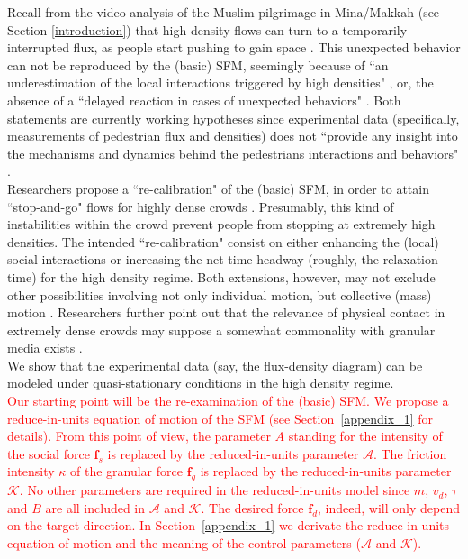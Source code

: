 \documentclass[preprint,12pt]{elsarticle}
\begin{document}
Recall from the video analysis of the Muslim pilgrimage in Mina/Makkah
(see Section \ref{introduction}) that high-density flows can turn to a
temporarily interrupted flux, as people
start pushing to gain space \cite{helbing3}. This unexpected behavior can not be
reproduced by the (basic) SFM, seemingly because of ``an
underestimation of the local interactions triggered by high densities"
\cite{yu1}, or, the absence of a ``delayed reaction in cases of unexpected
behaviors" \cite{johansson}. Both statements are currently working hypotheses since
experimental data (specifically, measurements of pedestrian flux and
densities) does not ``provide any insight into the mechanisms and
dynamics behind the pedestrians interactions and behaviors" \cite{johansson}.\\

Researchers propose a ``re-calibration" of the (basic) SFM, in order to
attain ``stop-and-go" flows for highly dense crowds
\cite{johansson,yu1}. Presumably, this kind of instabilities within the crowd prevent
people from stopping at extremely high densities. The intended
``re-calibration" consist on either enhancing the (local) social
interactions or increasing the net-time headway (roughly, the
relaxation time) for the high density regime. Both extensions,
however, may not exclude other possibilities involving not only
individual motion, but collective (mass) motion \cite{helbing3}. Researchers
further point out that the relevance of physical contact in extremely
dense crowds may suppose a somewhat commonality with granular
media exists \cite{helbing3}.\\

We show that the experimental data (say, the flux-density diagram) can be 
modeled under quasi-stationary conditions in the high density regime.\\

\textcolor{red}{Our starting point will be the re-examination of the (basic) SFM. 
We propose a reduce-in-units equation of motion of the SFM (see Section~\ref{appendix_1} 
for details). From this point of view, the parameter $A$ standing for the intensity of the
 social force $\mathbf{f}_s$ is replaced by the reduced-in-units parameter $\mathcal{A}$.
 The friction intensity $\kappa$ of the granular force $\mathbf{f}_g$ is replaced by the reduced-in-units
 parameter $\mathcal{K}$. No other parameters are required in the reduced-in-units model
 since $m$, $v_d$, $\tau$ and $B$ are all included in $\mathcal{A}$ and $\mathcal{K}$.
 The desired force $\mathbf{f}_d$, indeed, will only depend on the target direction. In Section~\ref{appendix_1} we derivate the 
reduce-in-units equation of motion and the meaning of the control parameters ($\mathcal{A}$ and $\mathcal{K}$). }\\
\end{document}
